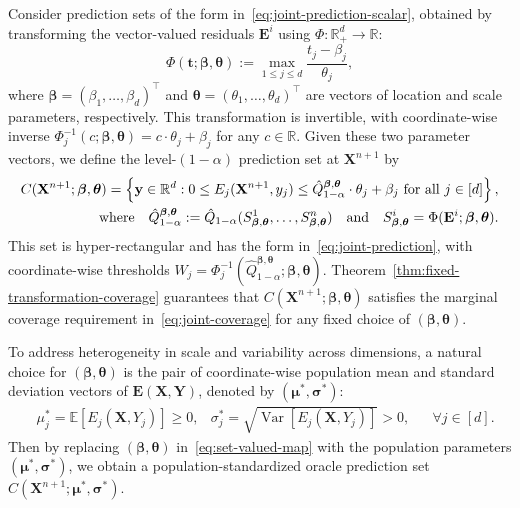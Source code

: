 {\color{blue}
Consider prediction sets of the form in~\eqref{eq:joint-prediction-scalar}, obtained by transforming the vector-valued residuals $\mathbf{E}^i$ using $\Phi : \mathbb{R}^{d}_+ \to \mathbb{R}$:
\begin{equation}
\Phi(\mathbf t; \boldsymbol \beta, \boldsymbol \theta)
:= \max_{1 \le j \le d} \frac{t_j - \beta_j}{\theta_j},
\label{eq:residual-transformation}
\end{equation}
where $\boldsymbol \beta = (\beta_1, \ldots, \beta_d)^\top$ and $\boldsymbol \theta = (\theta_1, \ldots, \theta_d)^\top$ are vectors of location and scale parameters, respectively. 
This transformation is invertible, with coordinate-wise inverse $\Phi^{-1}_j (c; \boldsymbol \beta, \boldsymbol \theta) = c \cdot \theta_j + \beta_j$ for any $c \in \mathbb{R}$. 
Given these two parameter vectors, we define the level-$(1-\alpha)$ prediction set at $\mathbf{X}^{n+1}$ by
\begin{equation}\label{eq:set-valued-map}
\begin{aligned}
C(\mathbf{X}^{n+1};\boldsymbol \beta, \boldsymbol \theta) = \left\{\mathbf y \in \mathbb{R}^d: 0\leq E_j(\mathbf{X}^{n+1}, y_j) \leq {\hat{Q}^{\boldsymbol{\beta},\boldsymbol{\theta}}_{1-\alpha} \cdot \theta_j + \beta_j}\text{ for all } j \in [d]\right\},\\
\text{where}\quad
\hat{Q}^{\boldsymbol{\beta},\boldsymbol{\theta}}_{1-\alpha}:= \hat{Q}_{1-\alpha}(S^1_{\boldsymbol{\beta}, \boldsymbol{\theta}},\ldots,S^n_{\boldsymbol{\beta}, \boldsymbol{\theta}})
\quad
\text{and}
\quad
S^i_{\boldsymbol{\beta}, \boldsymbol{\theta}} = \Phi(\mathbf{E}^i; \boldsymbol{\beta}, \boldsymbol{\theta}).
\end{aligned}
\end{equation}
This set is hyper-rectangular and has the form in~\eqref{eq:joint-prediction}, with coordinate-wise thresholds $W_j = \Phi^{-1}_j (\hat{Q}^{\boldsymbol{\beta},\boldsymbol{\theta}}_{1-\alpha}; \boldsymbol \beta, \boldsymbol \theta)$.
Theorem~\ref{thm:fixed-transformation-coverage} guarantees that $C(\mathbf{X}^{n+1};\boldsymbol \beta, \boldsymbol \theta)$ satisfies the marginal coverage requirement in~\eqref{eq:joint-coverage} for any fixed choice of $(\boldsymbol \beta, \boldsymbol \theta)$.

To address heterogeneity in scale and variability across dimensions, a natural choice for $(\boldsymbol \beta, \boldsymbol \theta)$ is the pair of coordinate-wise population mean and standard deviation vectors of $\mathbf E(\mathbf X, \mathbf Y)$, denoted by $(\boldsymbol\mu^*, \boldsymbol\sigma^*)$:
\begin{align} \label{eq:oracle-mean-std}
&\mu^*_j = \mathbb{E}[E_j(\mathbf X, Y_j)] \geq 0, 
&\sigma^*_j = \sqrt{\operatorname{Var}[E_j(\mathbf X, Y_j)]} > 0,
&&\forall j \in [d].
\end{align}
Then by replacing $(\boldsymbol \beta, \boldsymbol \theta)$ in~\eqref{eq:set-valued-map} with the population parameters $(\boldsymbol\mu^*, \boldsymbol\sigma^*)$, we obtain a population-standardized oracle prediction set $C(\mathbf{X}^{n+1}; \boldsymbol\mu^*, \boldsymbol\sigma^*)$. 
}

